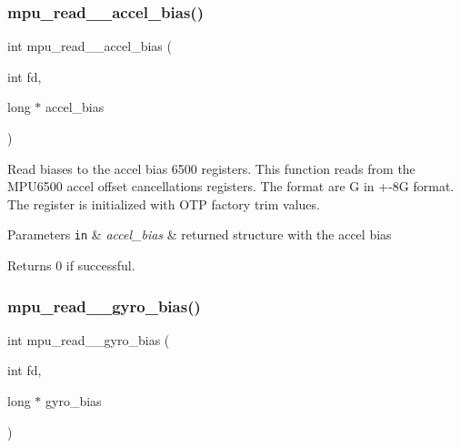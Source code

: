\subsubsection{mpu\+\_\+read\+\_\+\_\+accel\+\_\+bias()}
{\footnotesize\ttfamily int mpu\+\_\+read\+\_\+\_\+accel\+\_\+bias (\begin{DoxyParamCaption}\item[{int}]{fd,  }\item[{long $\ast$}]{accel\+\_\+bias }\end{DoxyParamCaption})}



Read biases to the accel bias 6500 registers. This function reads from the M\+P\+U6500 accel offset cancellations registers. The format are G in +-\/8G format. The register is initialized with O\+TP factory trim values. 


\begin{DoxyParams}[1]{Parameters}
\mbox{\tt in}  & {\em accel\+\_\+bias} & returned structure with the accel bias \\
\hline
\end{DoxyParams}
\begin{DoxyReturn}{Returns}
0 if successful. 
\end{DoxyReturn}
\mbox{\label{group___d_r_i_v_e_r_s_ga0073e09e935cf9a8f26c6d183e72c168}} 
\subsubsection{mpu\+\_\+read\+\_\+\_\+gyro\+\_\+bias()}
{\footnotesize\ttfamily int mpu\+\_\+read\+\_\+\_\+gyro\+\_\+bias (\begin{DoxyParamCaption}\item[{int}]{fd,  }\item[{long $\ast$}]{gyro\+\_\+bias }\end{DoxyParamCaption})}

\mbox{\label{group___d_r_i_v_e_r_s_gad2d70783f4788b9564ac5562fed4f154}} 
